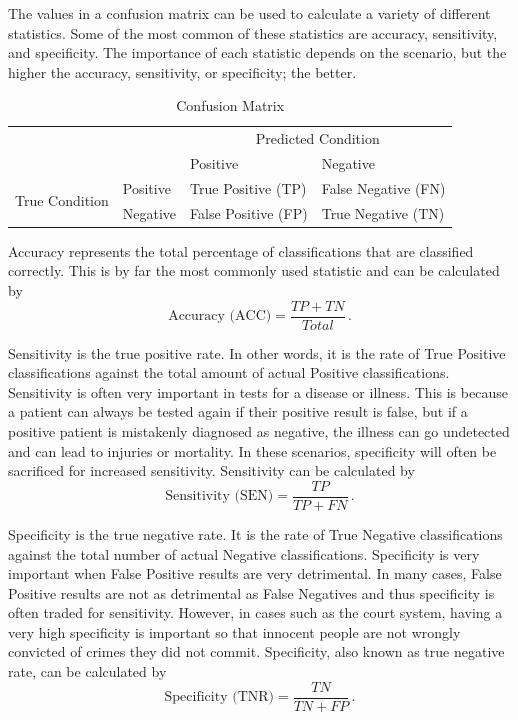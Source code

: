 \documentclass{article}
\begin{document}
The values in a confusion matrix can be used to calculate a variety of different statistics. Some of the most common of these statistics are accuracy, sensitivity, and specificity. The importance of each statistic depends on the scenario, but the higher the accuracy, sensitivity, or specificity; the better.

\begin{table}[h!]
	\centering
	\begin{tabular}{llll}
		&                       & \multicolumn{2}{c}{Predicted Condition}                       \\ \cline{3-4} 
		& \multicolumn{1}{l|}{} & \multicolumn{1}{l|}{Positive} & \multicolumn{1}{l|}{Negative} \\ \cline{2-4} 
		\multicolumn{1}{c|}{\multirow{2}{*}{True Condition}} & \multicolumn{1}{l|}{Positive} & \multicolumn{1}{l|}{True Positive (TP)} & \multicolumn{1}{l|}{False Negative (FN)} \\ \cline{2-4} 
		\multicolumn{1}{c|}{}                                & \multicolumn{1}{l|}{Negative} & \multicolumn{1}{l|}{False Positive (FP)} & \multicolumn{1}{l|}{True Negative (TN)}  \\ \cline{2-4} 
	\end{tabular}
	\caption{Confusion Matrix}
	\label{tab:confusion_matrix}
\end{table}

Accuracy represents the total percentage of classifications that are classified correctly. This is by far the most commonly used statistic and can be calculated by
\begin{equation}
	\text{Accuracy (ACC)} = \frac{TP + TN}{Total} \,.
\end{equation}

Sensitivity is the true positive rate. In other words, it is the rate of True Positive classifications against the total amount of actual Positive classifications. Sensitivity is often very important in tests for a disease or illness. This is because a patient can always be tested again if their positive result is false, but if a positive patient is mistakenly diagnosed as negative, the illness can go undetected and can lead to injuries or mortality. In these scenarios, specificity will often be sacrificed for increased sensitivity. Sensitivity can be calculated by
\begin{equation}
	\text{Sensitivity (SEN)} = \frac{TP}{TP + FN} \, .
\end{equation}

Specificity is the true negative rate. It is the rate of True Negative classifications against the total number of actual Negative classifications. Specificity is very important when False Positive results are very detrimental. In many cases, False Positive results are not as detrimental as False Negatives and thus specificity is often traded for sensitivity. However, in cases such as the court system, having a very high specificity is important so that innocent people are not wrongly convicted of crimes they did not commit. Specificity, also known as true negative rate, can be calculated by
\begin{equation}
	\text{Specificity (TNR)} = \frac{TN}{TN + FP} \, .
\end{equation}
\end{document}

